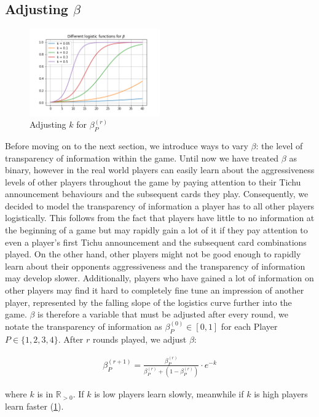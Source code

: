 \subsection{Adjusting $\beta$}
\begin{figure}[h!]
    \centering
    \includegraphics[width=0.5\textwidth]{Bilder/5_log}
    \caption{Adjusting $k$ for $\beta^{(r)}_{P}$}
    \label{fig:14}
\end{figure}
Before moving on to the next section, we introduce ways to vary $\beta$: the level of transparency of information within the game. Until now we have treated $\beta$ as binary, however in the real world players can easily learn about the aggressiveness levels of other players throughout the game by paying attention to their Tichu announcement behaviours and the subsequent cards they play. Consequently, we decided to model the transparency of information a player has to all other players logistically. This follows from the fact that players have little to no information at the beginning of a game but may rapidly gain a lot of it if they pay attention to even a player’s first Tichu announcement and the subsequent card combinations played. On the other hand, other players might not be good enough to rapidly learn about their opponents aggressiveness and the transparency of information may develop slower. Additionally, players who have gained a lot of information on other players may find it hard to completely fine tune an impression of another player, represented by the falling slope of the logistics curve further into the game. $\beta$ is therefore a variable that must be adjusted after every round, we notate the transparency of information as $\beta^{(0)}_{P}\in[0,1]$ for each Player $P\in\{1,2,3,4\}$. After $r$ rounds played, we adjust $\beta$:

\begin{align*}
\beta^{(r+1)}_{P} = \frac{\beta^{(r)}_{P}
}{\beta^{(r)}_{P} + (1 - \beta^{(r)}_{P})} \cdot e^{-k}
\end{align*}

where $k$ is in $\mathbb{R}_{>0}$. If $k$ is low players learn slowly, meanwhile if $k$ is high players learn faster (\ref{fig:14}).

